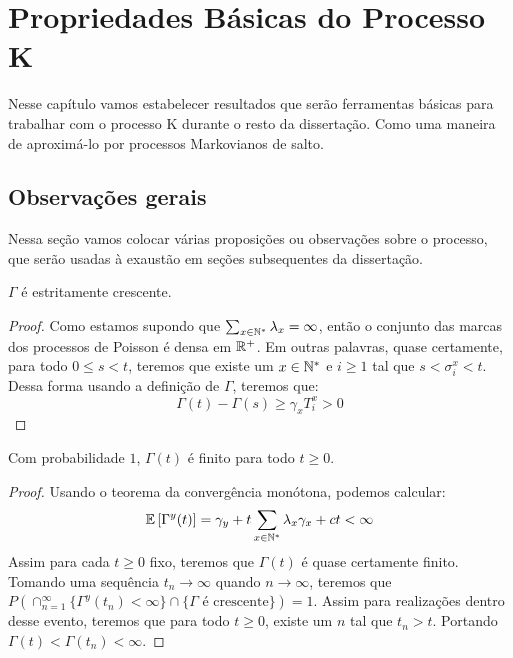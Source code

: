 \chapter{Propriedades Básicas do Processo K}
\label{cap:propriedades}

Nesse capítulo vamos estabelecer resultados que serão ferramentas
básicas para trabalhar com o processo K durante o resto da
dissertação. Como uma maneira de aproximá-lo por processos Markovianos
de salto.


\section{Observações gerais}
\label{sec:observacoes}

Nessa seção vamos colocar várias proposições ou observações sobre o
processo, que serão usadas à exaustão em seções subsequentes da
dissertação.

\begin{proposicao}
  \label{prop:gamma-crescente}
  $\Gamma$ é \qc estritamente crescente.
\end{proposicao}
\begin{proof}
  Como estamos supondo que $\sum_{x \in {\mathbb{N^*}}} \lambda_x = \infty$,
  então o conjunto das marcas dos processos de Poisson é \qc densa em
  ${\mathbb{R}}^+$. Em outras palavras, quase certamente, para todo $0 \leq s <
  t$, teremos que existe um $x \in {\mathbb{N^*}}$ e $i \geq 1$ tal que $s <
  \sigma^x_i < t$. Dessa forma usando a definição de $\Gamma$, teremos
  que:
  \begin{displaymath}
    \Gamma(t) - \Gamma(s) \geq \gamma_x T^x_i > 0
  \end{displaymath}
\end{proof}

\begin{proposicao}
  \label{prop:gamma-finita}
  Com probabilidade $1$, $\Gamma(t)$ é finito para todo $t \geq 0$.
\end{proposicao}
\begin{proof}
  Usando o teorema da convergência monótona, podemos calcular:
  \begin{displaymath}
    {\mathbb{E}} \left[\Gamma^y(t) \right] = \gamma_y + t \sum_{x \in {\mathbb{N^*}}}
    \lambda_x \gamma_x + ct < \infty
  \end{displaymath}
  Assim para cada $t \geq 0$ fixo, teremos que $\Gamma(t)$ é quase
  certamente finito. Tomando uma sequência $t_n \to \infty$ quando $n
  \to \infty$, teremos que $P(\cap_{n = 1}^{\infty} \{ \Gamma^y (t_n)
  < \infty \} \cap \{ \Gamma \textrm{ é crescente}\}) = 1$. Assim para
  realizações dentro desse evento, teremos que para todo $t \geq 0$,
  existe um $n$ tal que $t_n > t$. Portando $\Gamma(t) < \Gamma(t_n) <
  \infty$.
\end{proof}


